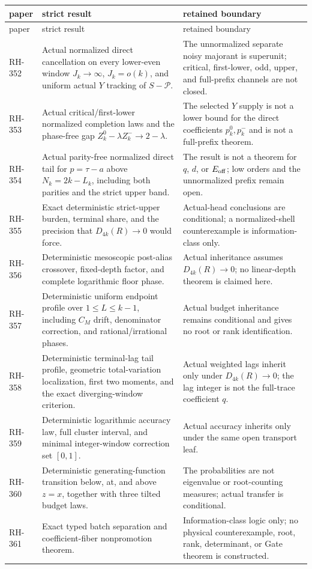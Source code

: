 \documentclass[11pt]{article}
\theoremstyle{definition}
\theoremstyle{remark}
\newcommand{\cP}{\mathcal P}
\begin{document}
\begin{longtable}{@{}>{\raggedright\arraybackslash}p{}
>{\raggedright\arraybackslash}p{}
>{\raggedright\arraybackslash}p{}@{}}
\toprule
paper & strict result & retained boundary\\
\midrule
\endfirsthead
\toprule
paper & strict result & retained boundary\\
\midrule
\endhead
RH-352 & Actual normalized direct cancellation on every lower-even window
$J_k\to\infty$, $J_k=o(k)$, and uniform actual $Y$ tracking of $S-\cP$. &
The unnormalized separate noisy majorant is superunit; critical, first-lower,
odd, upper, and full-prefix channels are not closed.\\
RH-353 & Actual critical/first-lower normalized completion laws and the
phase-free gap $Z_k^0-\lambda Z_k^-\to2-\lambda$. & The selected $Y$ supply
is not a lower bound for the direct coefficients $p_k^0,p_k^-$ and is not a
full-prefix theorem.\\
RH-354 & Actual parity-free normalized direct tail for
$p=\tau-a$ above $N_k=2k-L_k$, including both parities and the strict upper
band. & The result is not a theorem for $q$, $d$, or $E_{\rm off}$; low
orders and the unnormalized prefix remain open.\\
RH-355 & Exact deterministic strict-upper burden, terminal share, and the
precision that $D_{4k}(R)\to0$ would force. & Actual-head conclusions are
conditional; a normalized-shell counterexample is information-class only.\\
RH-356 & Deterministic mesoscopic post-alias crossover, fixed-depth factor,
and complete logarithmic floor phase. & Actual inheritance assumes
$D_{4k}(R)\to0$; no linear-depth theorem is claimed here.\\
RH-357 & Deterministic uniform endpoint profile over $1\le L\le k-1$,
including $C_M$ drift, denominator correction, and rational/irrational
phases. & Actual budget inheritance remains conditional and gives no root or
rank identification.\\
RH-358 & Deterministic terminal-lag tail profile, geometric total-variation
localization, first two moments, and the exact diverging-window criterion. &
Actual weighted lags inherit only under $D_{4k}(R)\to0$; the lag integer is
not the full-trace coefficient $q$.\\
RH-359 & Deterministic logarithmic accuracy law, full cluster interval, and
minimal integer-window correction set $[0,1]$. & Actual accuracy inherits
only under the same open transport leaf.\\
RH-360 & Deterministic generating-function transition below, at, and above
$z=x$, together with three tilted budget laws. & The probabilities are not
eigenvalue or root-counting measures; actual transfer is conditional.\\
RH-361 & Exact typed batch separation and coefficient-fiber nonpromotion
theorem. & Information-class logic only; no physical counterexample, root,
rank, determinant, or Gate theorem is constructed.\\
\bottomrule
\end{longtable}
\end{document}
